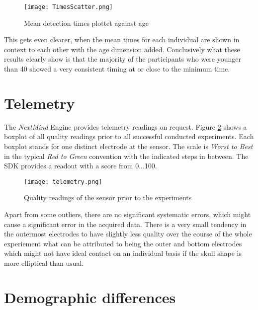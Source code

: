             \begin{figure}[h]     %
                \centering
                \texttt{[image: TimesScatter.png]} 
                \caption{Mean detection times plottet against age}\label{time-scatter}
            \end{figure} 

            This gets even clearer, when the mean times for each individual are shown in context to each other with the age dimension added. Conclusively what these results clearly show is that the majority of the participants who were younger than 40 showed a very consistent timing at or close to the minimum time.

        \section{Telemetry}

            The \textit{NextMind} Engine provides telemetry readings on request. Figure \ref*{telemetry} shows a boxplot of all quality readings prior to all successful conducted experiments. Each boxplot stands for one distinct electrode at the sensor. The scale is \textit{Worst to Best} in the typical \textit{Red to Green} convention with the indicated steps in between. The SDK provides a readout with a score from 0...100. 

            \begin{figure}[h]     %
                \centering
                \texttt{[image: telemetry.png]} 
                \caption{Quality readings of the sensor prior to the experiments}\label{telemetry}
            \end{figure} 
            
            Apart from some outliers, there are no significant systematic errors, which might cause a significant error in the acquired data. There is a very small tendency in the outermost electrodes to have slightly less quality over the course of the whole experiement what can be attributed to being the outer and bottom electrodes which might not have ideal contact on an individual basis if the skull shape is more elliptical than usual. 

        \section{Demographic differences}\label{demographic-differences}

